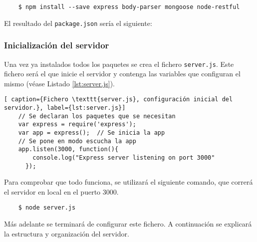 \begin{lstlisting}
    $ npm install --save express body-parser mongoose node-restful
\end{lstlisting}

El resultado del \texttt{package.json} sería el siguiente:


\subsubsection{Inicialización del servidor}

Una vez ya instalados todos los paquetes se crea el fichero \texttt{server.js}. Este fichero será el que inicie el servidor y contenga las variables que configuran el mismo (véase Listado \ref{lst:server.js}). 


\begin{lstlisting}[ caption={Fichero \texttt{server.js}, configuración inicial del servidor.}, label={lst:server.js}]
    // Se declaran los paquetes que se necesitan
    var express = require('express');  
    var app = express();  // Se inicia la app
    // Se pone en modo escucha la app
    app.listen(3000, function(){
        console.log("Express server listening on port 3000"
      });

\end{lstlisting}

Para comprobar que todo funciona, se utilizará el siguiente comando, que correrá el servidor en local en el puerto 3000.
\begin{lstlisting}
    $ node server.js
\end{lstlisting}

Más adelante se terminará de configurar este fichero. A continuación se explicará la estructura y organización del servidor.

